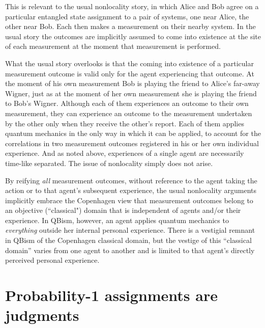 \documentclass[aps,prb,superscriptaddress,12pt,tightenlines,nofootinbib]{revtex4-2}
\begin{document}
This is relevant to the usual nonlocality story, in which Alice and Bob agree on a particular entangled state assignment to a pair of systems, one near Alice, the other near Bob.  Each then makes a measurement on their nearby system.    In the usual story the outcomes are implicitly assumed to come into  existence at the site of each measurement at the moment that measurement is performed.

What the usual story  overlooks is that the coming into existence of a particular measurement outcome is valid only for the agent  experiencing that outcome.   At the moment of his own measurement Bob is playing the friend to Alice's far-away Wigner, just as at the moment of her own measurement she is playing the friend to Bob's Wigner.  Although each of them experiences an outcome to their own measurement, they can experience an outcome to the measurement undertaken by the other only when they receive the other's report.  Each of them applies quantum mechanics in the only way in which it can be applied, to account for the correlations in two measurement outcomes registered in his or her own individual experience.   And as noted above, experiences of a single agent are necessarily time-like separated.  The issue of nonlocality simply does not arise.

By reifying {\it all} measurement outcomes, without  reference to the agent taking the action or to that agent's subsequent experience, the usual nonlocality  arguments implicitly embrace the Copenhagen view that measurement outcomes belong to an objective (``classical") domain that is independent of agents and/or their experience.    In QBism, however, an agent applies quantum mechanics to {\it everything} outside her internal personal experience.   There is a vestigial remnant  in QBism of  the Copenhagen classical domain, but  the vestige of this ``classical domain'' varies from one agent to another  and  is limited to that agent's directly perceived personal experience.


\section{Probability-1 assignments are judgments}
\end{document}
